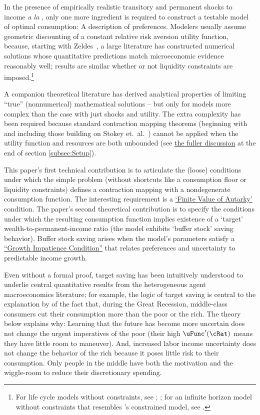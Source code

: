 \documentclass[BufferStockTheory]{subfiles}
\begin{document}
In the presence of empirically realistic transitory and permanent shocks to income \textit{a la} \cite{friedmanATheory}, only one more ingredient is required to construct a testable model of optimal consumption: A description of preferences.  Modelers usually assume geometric discounting of a constant relative risk aversion utility function, because, starting with Zeldes~\citeyearpar{zeldesStochastic}, a large literature has constructed numerical solutions whose quantitative predictions match microeconomic evidence reasonably well; results are similar whether or not liquidity constraints are imposed.\footnote{For life cycle models without constraints, see \cite{carrollBSLCPIH}; \cite{gpLifeCycle}; for an infinite horizon model without constraints that resembles \cite{deatonLiqConstr}'s constrained model, see \cite{carrollBrookings}.}

A companion theoretical literature has derived analytical properties of limiting ``true'' (nonnumerical) mathematical solutions -- but only for models more complex than the case with just shocks and utility.  The extra complexity has been required because standard contraction mapping theorems (beginning with \cite{bellmanDynamicProgramming} and including those building on Stokey et.~al.~\citeyearpar{slpMethods}) cannot be applied when the utility function and resources are both unbounded (see \hyperlink{DiffFromLit}{the fuller discussion} at the end of section \ref{subsec:Setup}).

This paper's first technical contribution is to articulate the (loose) conditions under which the simple problem (without shortcuts like a consumption floor or liquidity constraints) defines a contraction mapping with a nondegenerate consumption function.  The interesting requirement is a \hyperlink{FVAC}{`Finite Value of Autarky'} condition.  The paper's second theoretical contribution is to specify the conditions under which the resulting consumption function implies existence of a `target' wealth-to-permanent-income ratio (the model exhibits `buffer stock' saving behavior).  Buffer stock saving arises when the model's parameters satisfy a \hyperlink{GIC}{``Growth Impatience Condition''} that relates preferences and uncertainty to predictable income growth.

\hypertarget{KMP}{}

Even without a formal proof, target saving has been intuitively understood to underlie central quantitative results from the heterogeneous agent macroeconomics literature; for example, the logic of target saving is central to the explanation by \cite{kmpHandbook} of the fact that, during the Great Recession, middle-class consumers cut their consumption more than the poor or the rich.  The theory below explains why:  Learning that the future has become more uncertain does not change the urgent imperatives of the poor (their high $\uFunc^{\prime}(\cRat)$ means they have little room to maneuver).  And, increased labor income uncertainty does not change the behavior of the rich because it poses little risk to their consumption.  Only people in the middle have both the motivation and the wiggle-room to reduce their discretionary spending.
\end{document}
